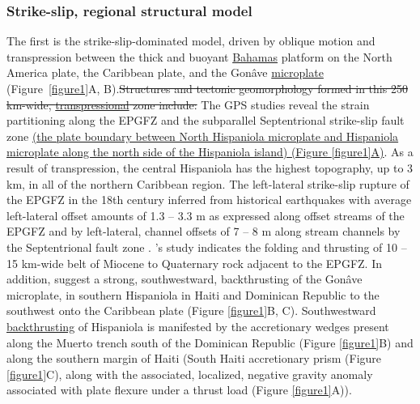 \documentclass[linenumbers,draft]{agujournal}
\begin{document}
\subsubsection{Strike-slip, regional structural model}
The first is the strike-slip-dominated model, driven by oblique motion and transpression between the thick and buoyant \ul{Bahamas} platform on the North America plate, the Caribbean plate, and the Gon\^ave \ul{microplate} \citep{mann1995actively,dolan1998active,mann2002oblique,calais2002strain,calais2016plate} (Figure~\ref{figure1}A, B).\st{Structures and tectonic geomorphology formed in this 250 km-wide, \mbox{\underline{transpressional}} zone include:} The GPS studies \citep{calais2002strain,calais2010transpressional,hayes2010complex,symithe2013coseismic,douilly2013crustal,douilly2015three} reveal the strain partitioning along the EPGFZ and the subparallel Septentrional strike-slip fault zone \ul{(the plate boundary between North Hispaniola microplate and Hispaniola microplate along the north side of the Hispaniola island) (Figure {\ref{figure1}}A)}. As a result of transpression, the central Hispaniola has the highest topography, up to 3 km, in all of the northern Caribbean region. The left-lateral strike-slip rupture of the EPGFZ in the 18th century inferred from historical earthquakes \citep{bakun2012significant} with average left-lateral offset amounts of 1.3 -- 3.3 m as expressed along offset streams of the EPGFZ \citep{prentice2010seismic} and by left-lateral, channel offsets of 7 -- 8 m along stream channels by the Septentrional fault zone \underline{\citep{prentice1993paleoseismicity,leroy2015segmentation}}. \citet{saint2015seismotectonics}'s study indicates the folding and thrusting of 10 -- 15 km-wide belt of Miocene to Quaternary rock adjacent to the EPGFZ. In addition, \citep{mann2002oblique,grindlay2005high,kroehler2011late} suggest a strong, southwestward, backthrusting of the Gon\^ave microplate, in southern Hispaniola in Haiti and Dominican Republic to the southwest onto the Caribbean plate (Figure \ref{figure1}B, C). Southwestward \ul{backthrusting} of Hispaniola is manifested by the accretionary wedges present along the Muerto trench south of the Dominican Republic \citep{bien1986contribution,bruna2009morphotectonics} (Figure \ref{figure1}B) and along the southern margin of Haiti (South Haiti accretionary prism \citep{bien1986contribution} (Figure \ref{figure1}C), along with the associated, localized, negative gravity anomaly associated with plate flexure under a thrust load \citep{mann2002oblique,bruna2009morphotectonics} (Figure \ref{figure1}A)).
\end{document}
